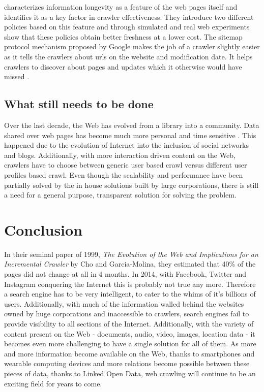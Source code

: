\documentclass[a4paper, 11pt]{article} %
\begin{document}
\cite{olston2008recrawl} characterizes information longevity as a feature of the web pages itself and identifies it as a key factor in crawler effectiveness. They introduce two different policies based on this feature and through simulated and real web experiments show that these policies obtain better freshness at a lower cost. The sitemap protocol mechanism proposed by Google makes the job of a crawler slightly easier as it tells the crawlers about urls on the website and modification date. It helps crawlers to discover about pages and updates which it otherwise would have missed \cite{google2014sitemap}. 

\subsection{What still needs to be done}

Over the last decade, the Web has evolved from a library into a community. Data shared over web pages has become much more personal and time sensitive \cite{cho2010dealing}. This happened due to the evolution of Internet into the inclusion of social networks and blogs. Additionally, with more interaction driven content on the Web, crawlers have to choose between generic user based crawl versus different user profiles based crawl. Even though the scalability and performance have been partially solved by the in house solutions built by large corporations, there is still a need for a general purpose, transparent solution for solving the problem.

\section{Conclusion}

In their seminal paper of 1999, \textit{The Evolution of the Web and Implications for an Incremental Crawler} by Cho and Garcia-Molina, they estimated that 40\% of the pages did not change at all in 4 months. In 2014, with Facebook, Twitter and Instagram conquering the Internet this is probably not true any more. Therefore a search engine has to be very intelligent, to cater to the whims of it's billions of users. Additionally, with much of the information walled behind the websites owned by huge corporations and inaccessible to crawlers, search engines fail to provide visibility to all sections of the Internet. Additionally, with the variety of content present on the Web - documents, audio, video, images, location data - it becomes even more challenging to have a single solution for all of them. As more and more information become available on the Web, thanks to smartphones and wearable computing devices and more relations become possible between these pieces of data, thanks to Linked Open Data, web crawling will continue to be an exciting field for years to come.
\end{document}
